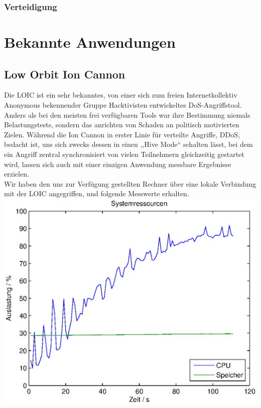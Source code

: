 \documentclass[12pt,a4paper]{article}
\begin{document}
\subsubsection*{Verteidigung}
\section{Bekannte Anwendungen}
\subsection{Low Orbit Ion Cannon}
Die LOIC ist ein sehr bekanntes, von einer sich zum freien Internetkollektiv Anonymous bekennender Gruppe Hacktivisten entwickeltes DoS-Angriffstool. Anders als bei den meisten frei verfügbaren Tools war ihre Bestimmung niemals Belastungstests, sondern das anrichten von Schaden an politisch motivierten Zielen. Während die Ion Cannon in erster Linie für verteilte Angriffe, DDoS, bedacht ist, uns sich zwecks dessen in einen ,,Hive Mode`` schalten lässt, bei dem ein Angriff zentral synchronisiert von vielen Teilnehmern gleichzeitig gestartet wird, lassen sich auch mit einer einzigen Anwendung messbare Ergebnisse erzielen.\\
Wir haben den uns zur Verfügung gestellten Rechner über eine lokale Verbindung mit der LOIC angegriffen, und folgende Messwerte erhalten.\\
\includegraphics[scale=0.9]{MatLab/LOICVictimSys.eps}\\
\end{document}
